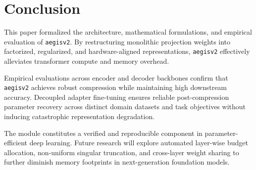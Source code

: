 \section{Conclusion}
This paper formalized the architecture, mathematical formulations, and empirical evaluation of \texttt{aegisv2}. By restructuring monolithic projection weights into factorized, regularized, and hardware-aligned representations, \texttt{aegisv2} effectively alleviates transformer compute and memory overhead.

Empirical evaluations across encoder and decoder backbones confirm that \texttt{aegisv2} achieves robust compression while maintaining high downstream accuracy. Decoupled adapter fine-tuning ensures reliable post-compression parameter recovery across distinct domain datasets and task objectives without inducing catastrophic representation degradation.

The module constitutes a verified and reproducible component in parameter-efficient deep learning. Future research will explore automated layer-wise budget allocation, non-uniform singular truncation, and cross-layer weight sharing to further diminish memory footprints in next-generation foundation models.
